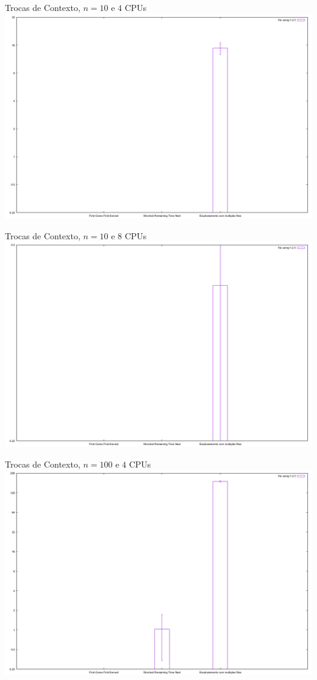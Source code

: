 \documentclass{beamer}
\begin{document}
\begin{frame}{Trocas de Contexto, $n = 10$ e $4$ CPUs}
	\includegraphics[width=\textwidth]{graphs/testes_capella/result/trocas-r4-10}
\end{frame}


\begin{frame}{Trocas de Contexto, $n = 10$ e $8$ CPUs}
	\includegraphics[width=\textwidth]{graphs/testes_capella/result/trocas-r8-10}
\end{frame}


\begin{frame}{Trocas de Contexto, $n = 100$ e $4$ CPUs}
	\includegraphics[width=\textwidth]{graphs/testes_capella/result/trocas-r4-100}
\end{frame}
\end{document}
